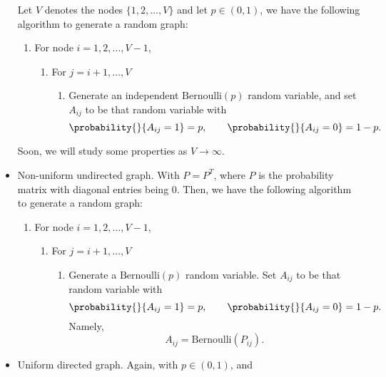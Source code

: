 \begin{itemize}
	      Let \(V\) denotes the nodes \(\{1, 2, \ldots , V\}\) and let \(p\in(0, 1)\), we have the following algorithm to generate a random graph:
	      \begin{enumerate}
		      \item For node \(i = 1, 2, \ldots , V - 1\),
		            \begin{enumerate}
			            \item For \(j = i+1, \ldots , V\)
			                  \begin{enumerate}
				                  \item Generate an independent \(\mathrm{Bernoulli}(p)\) random variable, and set \(A_{ij}\) to be that random variable with
				                        \[
					                        \probability{}{A_{ij} = 1} = p, \qquad \probability{}{A_{ij} = 0} = 1-p  .
				                        \]
			                  \end{enumerate}
		            \end{enumerate}
	      \end{enumerate}
	      Soon, we will study some properties as \(V\to \infty\).
	\item Non-uniform undirected graph. With \(P = P^{T}\), where \(P\) is the probability matrix with diagonal entries being \(0\). Then, we have the following algorithm to
	      generate a random graph:
	      \begin{enumerate}
		      \item For node \(i = 1, 2, \ldots , V - 1\),
		            \begin{enumerate}
			            \item For \(j = i+1, \ldots , V\)
			                  \begin{enumerate}
				                  \item Generate a \(\mathrm{Bernoulli}(p)\) random variable. Set \(A_{ij}\) to be that random variable with
				                        \[
					                        \probability{}{A_{ij} = 1} = p, \qquad \probability{}{A_{ij} = 0} = 1-p  .
				                        \]
				                        Namely,
				                        \[
					                        A_{ij} = \mathrm{Bernoulli}(P_{ij}).
				                        \]
			                  \end{enumerate}
		            \end{enumerate}
	      \end{enumerate}
	\item Uniform directed graph. Again, with \(p\in(0, 1)\), and

\end{itemize}
